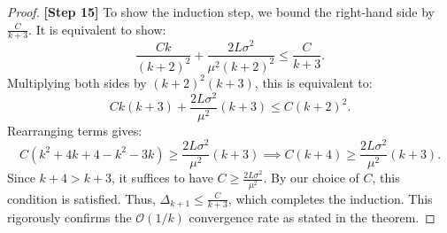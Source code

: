 \documentclass[11pt]{article}
\begin{document}
\begin{proof}
\textbf{[Step 15]} To show the induction step, we bound the right-hand side by $\frac{C}{k+3}$. It is equivalent to show:
\[ \frac{C k}{(k+2)^2} + \frac{2 L \sigma^2}{\mu^2 (k+2)^2} \le \frac{C}{k+3}. \]
Multiplying both sides by $(k+2)^2(k+3)$, this is equivalent to:
\[ C k (k+3) + \frac{2 L \sigma^2}{\mu^2} (k+3) \le C (k+2)^2. \]
Rearranging terms gives:
\[ C (k^2 + 4k + 4 - k^2 - 3k) \ge \frac{2 L \sigma^2}{\mu^2} (k+3) \implies C(k+4) \ge \frac{2 L \sigma^2}{\mu^2} (k+3). \]
Since $k+4 > k+3$, it suffices to have $C \ge \frac{2 L \sigma^2}{\mu^2}$. By our choice of $C$, this condition is satisfied. Thus, $\Delta_{k+1} \le \frac{C}{k+3}$, which completes the induction. This rigorously confirms the $\mathcal{O}(1/k)$ convergence rate as stated in the theorem.
\end{proof}
\end{document}
